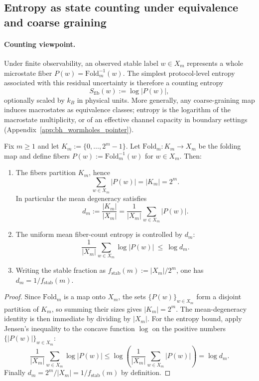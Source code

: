 \subsection{Entropy as state counting under equivalence and coarse graining}
\label{subsec:entropy_state_counting}

\paragraph{Counting viewpoint.}
\InterfaceTag Under finite observability, an observed stable label $w\in X_m$ represents a whole microstate fiber $P(w)=\mathrm{Fold}_m^{-1}(w)$.
The simplest protocol-level entropy associated with this residual uncertainty is therefore a counting entropy
\[
S_{\mathrm{fib}}(w):=\log |P(w)|,
\]
optionally scaled by $k_B$ in physical units.
More generally, any coarse-graining map induces macrostates as equivalence classes; entropy is the logarithm of the macrostate multiplicity, or of an effective channel capacity in boundary settings (Appendix~\ref{app:bh_wormholes_pointer}).

\begin{lemma}\label{lem:mean_degeneracy_fiber_entropy_bounds}
\MathTag Fix $m\ge 1$ and let $K_m:=\{0,\dots,2^m-1\}$.
Let $\mathrm{Fold}_m:K_m\to X_m$ be the folding map and define fibers $P(w):=\mathrm{Fold}_m^{-1}(w)$ for $w\in X_m$.
Then:
\begin{enumerate}
\item The fibers partition $K_m$, hence
\[
\sum_{w\in X_m}|P(w)|=|K_m|=2^m.
\]
In particular the mean degeneracy satisfies
\[
d_m:=\frac{|K_m|}{|X_m|}=\frac{1}{|X_m|}\sum_{w\in X_m}|P(w)|.
\]
\item The uniform mean fiber-count entropy is controlled by $d_m$:
\[
\frac{1}{|X_m|}\sum_{w\in X_m}\log|P(w)|\ \le\ \log d_m.
\]
\item Writing the stable fraction as $f_{\mathrm{stab}}(m):=|X_m|/2^m$, one has $d_m=1/f_{\mathrm{stab}}(m)$.
\end{enumerate}
\end{lemma}
\begin{proof}
Since $\mathrm{Fold}_m$ is a map onto $X_m$, the sets $\{P(w)\}_{w\in X_m}$ form a disjoint partition of $K_m$, so summing their sizes gives $|K_m|=2^m$.
The mean-degeneracy identity is then immediate by dividing by $|X_m|$.
For the entropy bound, apply Jensen's inequality to the concave function $\log$ on the positive numbers $\{|P(w)|\}_{w\in X_m}$:
\[
\frac{1}{|X_m|}\sum_{w\in X_m}\log|P(w)|\le \log\!\left(\frac{1}{|X_m|}\sum_{w\in X_m}|P(w)|\right)=\log d_m.
\]
Finally $d_m=2^m/|X_m|=1/f_{\mathrm{stab}}(m)$ by definition.
\end{proof}

